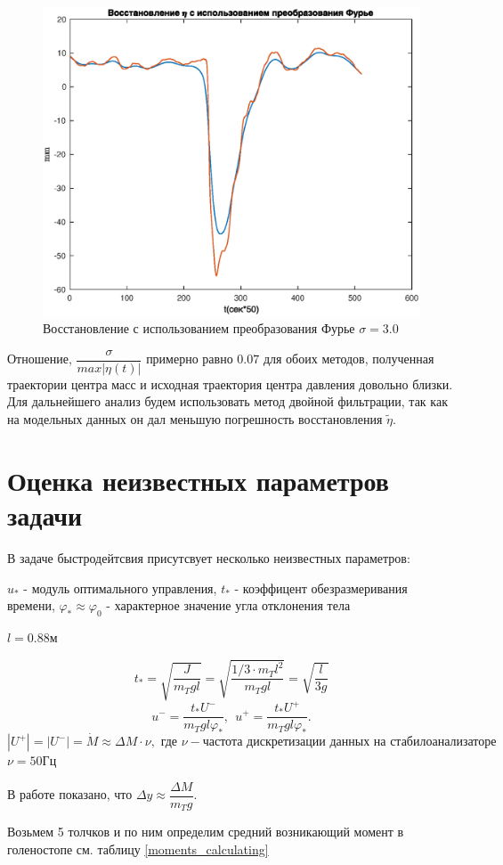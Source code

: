 \documentclass[a4paper,12pt, openany]{book}
\theoremstyle{plain} %
\theoremstyle{definition} %
\theoremstyle{remark} %
\numberwithin{equation}{chapter}
\begin{document}
{\begin{figure}[h!]
    \centering
    \includegraphics[width=0.65\linewidth]{restore_eta_fur_real.eps}
    \caption{Восстановление с использованием преобразования Фурье $\sigma=3.0$}
    \label{restore_fur_real}
\end{figure}

Отношение, $\dfrac{\sigma}{max|\eta(t)|}$ примерно равно $0.07$ для обоих методов, полученная траектории центра масс и исходная траектория 
центра давления довольно близки. Для дальнейшего анализ будем использовать метод двойной фильтрации, 
так как на модельных данных он дал меньшую погрешность восстановления $\tilde{\eta}$.

\section{Оценка неизвестных параметров задачи}

В задаче быстродейтсвия присутсвует несколько неизвестных параметров:

$u_*$ - модуль оптимального управления,
$t_*$ - коэффицент обезразмеривания времени,
$\varphi_*\approx\varphi_0$ - характерное значение угла отклонения тела


$l=0.88$м

$$t_\ast=\sqrt{\frac{J}{m_Tgl}}=\sqrt{\frac{1/3 \cdot m_T l^2}{m_Tgl}}=\sqrt{\frac{l}{3g}}$$
\[
    u^-=\frac{t_\ast U^-}{m_Tgl\varphi_\ast },\ \ u^+=\frac{t_\ast U^+}{m_Tgl\varphi_\ast}.
\]
$|U^+|=|U^-|=\dot M\approx \Delta M \cdot \nu, \text{ где } \nu - \text{частота дискретизации данных на стабилоанализаторе } $
$\nu =50\text{Гц}$

В работе \cite{kruchinMetoda} показано, что $\Delta y\approx\dfrac{\Delta M}{m_Tg}$.

Возьмем 5 толчков и по ним определим средний возникающий момент в голеностопе см. таблицу \ref*{moments_calculating}

}
\end{document}
